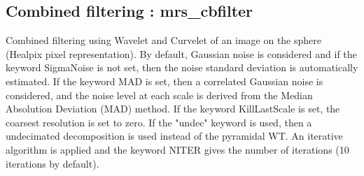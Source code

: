 \subsection{Combined filtering : mrs\_cbfilter}
Combined filtering using Wavelet and Curvelet of an image on the sphere (Healpix pixel representation). By default, Gaussian noise 
is considered and if the keyword SigmaNoise is not set, then the noise standard deviation is automatically estimated. If the keyword 
MAD is set, then a correlated Gaussian noise is considered, and the noise level at each scale is derived from the Median Absolution 
Deviation (MAD) method. If the keyword KillLastScale is set, the coarsest resolution is set to zero. If the "undec" keyword is used, 
then a undecimated decomposition is used instead of the pyramidal WT. An iterative algorithm is applied and the keyword NITER gives 
the number of iterations (10 iterations by default).

